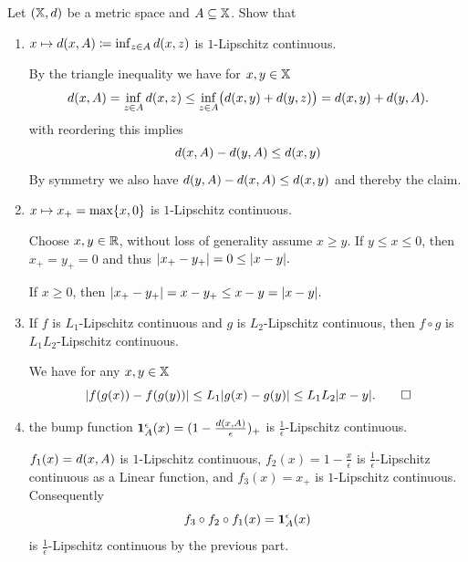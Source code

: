 \begin{exercise}
    \label{ex: lipschitz bump functions}
    Let \((\mathbb{X}, d)\) be a metric space and \(A \subseteq \mathbb{X}\). 
    Show that
    \begin{enumerate}[label=(\alph*)]
        \item \(x\mapsto d(x,A)\coloneq \inf_{z \in A} d(x,z)\) is \(1\)-Lipschitz continuous.
        \begin{solution}
        By the triangle inequality we have for \(x,y\in \mathbb{X}\)
        \[
            d(x,A)
            =\inf_{z\in A} d(x,z)
            \le \inf_{z\in A} \bigl(d(x,y) + d(y,z)\bigr)
            = d(x,y) + d(y,A).
        \]
        with reordering this implies
        \[
            d(x,A) - d(y,A) \le d(x,y)
        \]
        By symmetry we also have  \(d(y,A) - d(x,A) \le d(x,y)\)
        and thereby the claim.
        \end{solution}

        \item \(x\mapsto x_+ = \max\{x,0\}\) is \(1\)-Lipschitz continuous.
        \begin{solution}
            Choose \(x,y\in \mathbb{R}\), without loss of generality
            assume \(x \ge y\). If \(y\le x\le 0\), then \(x_+ = y_+ = 0\) and thus
            \(
                \lvert x_+ - y_+\rvert = 0 \le \lvert x-y\rvert. 
            \)

            If \(x\ge 0\), then
            \(
                \lvert x_+ - y_+\rvert = x - y_+ \le x-y = \lvert x-y\rvert.
            \)
        \end{solution}

        \item If \(f\) is \(L_1\)-Lipschitz continuous and \(g\) is \(L_2\)-Lipschitz continuous, then
        \(f\circ g\) is \(L_1L_2\)-Lipschitz continuous.
        \begin{solution}
            We have for any \(x,y\in \mathbb{X}\)
            \[
                \lvert f(g(x)) - f(g(y))\rvert
                \le L_1 \lvert g(x) - g(y)\rvert
                \le L_1L_2 \lvert x-y\rvert.
                \qedhere
            \]
        \end{solution}


        \item the bump function \(\ind{A}^\epsilon(x) = (1 - \frac{\metric(x,A)}\epsilon)_+\)
        is \(\frac1\epsilon\)-Lipschitz continuous.
        \begin{solution}
            \(f_1(x) = d(x,A)\) is \(1\)-Lipschitz continuous,
            \(f_2(x) = 1 - \frac{x}{\epsilon}\) is \(\frac1\epsilon\)-Lipschitz continuous
            as a Linear function, and \(f_3(x) = x_+\) is \(1\)-Lipschitz continuous. Consequently
            \[
                f_3 \circ f_2 \circ f_1(x) = \ind{A}^\epsilon(x)
            \]
            is \(\frac1\epsilon\)-Lipschitz continuous by the previous part.
        \end{solution}
    \end{enumerate}
\end{exercise}

